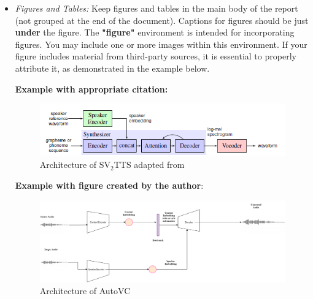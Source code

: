 \begin{itemize}
    \begin{quote}
        \verb|\section{Deepfake Audio Systems}|\\
        \verb|\subsection{AutoV}|\\
        \verb|\subsubsection{Architecture}|
        
    \end{quote}

    \item \emph{Figures and Tables:} Keep figures and tables in the main body of the report (not grouped at the end of the document).  Captions for figures should be just \textbf{under} the figure. The \textbf{"figure"} environment is intended for incorporating figures. You may include one or more images within this environment. If your figure includes material from third-party sources, it is essential to properly attribute it, as demonstrated in the example below. 
    
    \textbf{Example with appropriate citation:}

    \begin{figure}[htbp]
        \centering
        \includegraphics[width=\textwidth]{chapters/chapter2/sv2tts.png}
        \caption{Architecture of SV$_2$TTS adapted from \cite{jia_transfer_2019}}
        \label{fig:sv2tts}
    \end{figure}

    \textbf{Example with figure created by the author}:
    
    \begin{figure}[htbp]
        \centering
        \includegraphics[width=\textwidth]{chapters/chapter2/autovc.png}
        \caption{Architecture of AutoVC}
        \label{fig:autovc}
    \end{figure}
    

\end{itemize}

